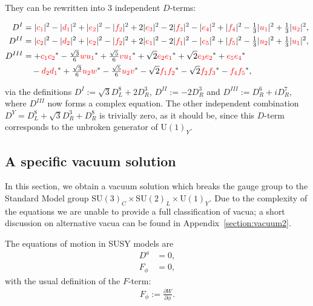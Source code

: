 \documentclass[a4paper,12pt]{article}
\def\SU{\mathrm{SU}}
\def\RED{\textcolor{red}}
\begin{document}
They can be rewritten into $3$ independent $D$-terms:

\begin{align}
D^{I}&=|\RED{c_1}|^2 - |\RED{d_1}|^2+ |\RED{e_2}|^2 -|\RED{f_2}|^2 +2 |\RED{e_3}|^2 -2 |\RED{f_3}|^2 -|\RED{e_4}|^2 +|\RED{f_4}|^2 -\tfrac{1}{3}|\RED{u_1}|^2+\tfrac{1}{3}|\RED{u_2}|^2,\label{equation:D-term-summary-first}\\
D^{II}&=|\RED{c_2}|^2-|\RED{d_2}|^2+|\RED{e_2}|^2-|\RED{f_2}|^2+2 |\RED{e_1}|^2-2 |\RED{f_1}|^2-|\RED{e_5}|^2+|\RED{f_5}|^2-\tfrac{1}{3}|\RED{u_2}|^2+\tfrac{1}{3}|\RED{u_1}|^2,\\
D^{III}&=+
\RED{c_1} \RED{c_2}^\ast-\tfrac{\sqrt{3}}{6} \RED{w} \RED{u_1}^\ast+\tfrac{\sqrt{5}}{6} \RED{v} \RED{u_1}^\ast
+\sqrt{2} \RED{e_2}\RED{e_1}^\ast+\sqrt{2} \RED{e_3}\RED{e_2}^\ast+\RED{e_5}\RED{e_4}^\ast\nonumber\\
&\quad - \RED{d_2}\RED{d_1}^\ast+\tfrac{\sqrt{3}}{6} \RED{u_2} \RED{w}^\ast-\tfrac{\sqrt{5}}{6} \RED{u_2} \RED{v}^\ast
-\sqrt{2} \RED{f_1}\RED{f_2}^\ast-\sqrt{2}\RED{f_2}\RED{f_3}^\ast-\RED{f_4}\RED{f_5}^\ast,\label{equation:D-term-summary-last}
\end{align}

\noindent
via the definitions $D^I:=\sqrt{3}D_L^8+2D_R^3$, $D^{II}:=-2D_R^3$ and $D^{III}:=D_R^6+i D_R^7$, where $D^{III}$ now forms a complex equation. The other independent combination $D^Y=D_L^8+\sqrt{3}D_R^3+D_R^8$ is trivially zero, as it should be, since this $D$-term corresponds to the unbroken generator of $\mathrm{U}(1)_Y$.

\subsection{A specific vacuum solution}
In this section, we obtain a vacuum solution which breaks the gauge group to the Standard Model group $\SU(3)_C\times\SU(2)_L\times\mathrm{U}(1)_Y$. Due to the complexity of the equations we are unable to provide a full classification of vacua; a short discussion on alternative vacua can be found in Appendix~\ref{section:vacuum2}.

The equations of motion in SUSY models are
\begin{align}
D^a&=0,\\
F_\phi&=0,
\end{align}
with the usual definition of the $F$-term:
\begin{align}
F_\phi:=\frac{\partial W}{\partial \phi}.
\end{align}
\end{document}
